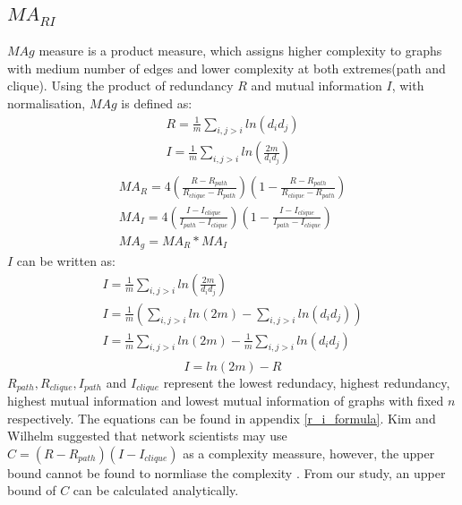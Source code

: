 \documentclass[12pt]{article}
\begin{document}
{\subsection{$MA_{RI}$}
$MAg$ measure is a product measure, which assigns higher complexity to graphs with medium number of edges and lower complexity at both extremes(path and clique). Using the product of redundancy $R$ and mutual information $I$, with normalisation, $MAg$ is defined as\cite{KIM20082637}:
\begin{equation}
    \label{eq:RandI}
    \begin{gathered}
        R = \frac{1}{m}\sum_{i,j>i}ln(d_id_j)\\
        I = \frac{1}{m}\sum_{i,j>i}ln(\frac{2m}{d_id_j})\\
    \end{gathered}
\end{equation}
\begin{equation}
    \label{eq:mag}
    \begin{gathered}
        MA_R = 4(\frac{R-R_{path}}{R_{clique}-R_{path}})(1-\frac{R-R_{path}}{R_{clique}-R_{path}})\\
        MA_I = 4(\frac{I-I_{clique}}{I_{path}-I_{clique}})(1-\frac{I-I_{clique}}{I_{path}-I_{clique}})\\
        MA_g = MA_R * MA_I
    \end{gathered}
\end{equation}
$I$ can be written as:
\begin{equation}
    \begin{gathered}
        \label{eq:rewriteI}
        I = \frac{1}{m}\sum_{i,j>i}ln(\frac{2m}{d_id_j})\\
        I = \frac{1}{m}(\sum_{i,j>i}ln(2m)-\sum_{i,j>i}ln(d_id_j))\\
        I = \frac{1}{m}\sum_{i,j>i}ln(2m)-\frac{1}{m}\sum_{i,j>i}ln(d_id_j)\\
    \end{gathered}
\end{equation}
\begin{equation}
    \label{eq:mutual_info}
    I = ln(2m)-R
\end{equation}
\noindent
$R_{path},R_{clique},I_{path}$ and $I_{clique}$ represent the lowest redundacy, highest redundancy, highest mutual information and lowest mutual information of graphs with fixed $n$ respectively. The equations can be found in appendix \ref{r_i_formula}. Kim and Wilhelm suggested that network scientists may use $C=(R-R_{path})(I-I_{clique})$ as a complexity meassure, however, the upper bound cannot be found to normliase the complexity \cite{KIM20082637}. From our study, an upper bound of $C$ can be calculated analytically.\\
}
\end{document}
